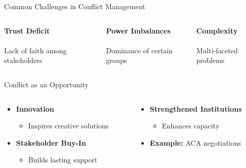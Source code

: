 \documentclass[10pt]{beamer}
\begin{document}
\begin{frame}{Common Challenges in Conflict Management}
    \begin{columns}[t]
        \begin{column}{0.33\textwidth}
            \centering
            \textbf{Trust Deficit}\\
            \\
            Lack of faith among stakeholders
        \end{column}
        \begin{column}{0.33\textwidth}
            \centering
            \textbf{Power Imbalances}\\
            \\
            Dominance of certain groups
        \end{column}
        \begin{column}{0.33\textwidth}
            \centering
            \textbf{Complexity}\\
            \\
            Multi-faceted problems
        \end{column}
    \end{columns}
\end{frame}

\begin{frame}{Conflict as an Opportunity}
    \begin{columns}[T]
        \begin{column}{0.5\textwidth}
            \begin{itemize}
                \item \textbf{Innovation} 
                \begin{itemize}
                    \item Inspires creative solutions
                \end{itemize}
                \item \textbf{Stakeholder Buy-In} 
                \begin{itemize}
                    \item Builds lasting support
                \end{itemize}
            \end{itemize}
        \end{column}
        \begin{column}{0.5\textwidth}
            \begin{itemize}
                \item \textbf{Strengthened Institutions} 
                \begin{itemize}
                    \item Enhances capacity
                \end{itemize}
                \item \textbf{Example:} ACA negotiations
            \end{itemize}
        \end{column}
    \end{columns}
\end{frame}
\end{document}
